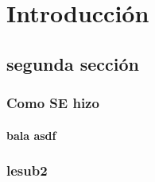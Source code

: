 \chapter{Introducción}
\section{segunda sección}

\subsection{Como SE hizo}


\subsubsection{bala asdf}

\subsection{lesub2}